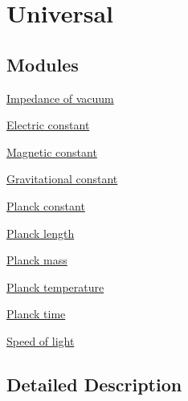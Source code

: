 \hypertarget{group___universal}{}\section{Universal}
\label{group___universal}
\subsection*{Modules}
\begin{DoxyCompactItemize}
\item 
\hyperlink{group___impedance_of_vacuum}{Impedance of vacuum}
\item 
\hyperlink{group___electric_constant}{Electric constant}
\item 
\hyperlink{group___magnetic_constant}{Magnetic constant}
\item 
\hyperlink{group___gravitational_constant}{Gravitational constant}
\item 
\hyperlink{group___planck_constant}{Planck constant}
\item 
\hyperlink{group___planck_length}{Planck length}
\item 
\hyperlink{group___planck_mass}{Planck mass}
\item 
\hyperlink{group___planck_temperature}{Planck temperature}
\item 
\hyperlink{group___planck_time}{Planck time}
\item 
\hyperlink{group___speed_of_light}{Speed of light}
\end{DoxyCompactItemize}


\subsection{Detailed Description}

